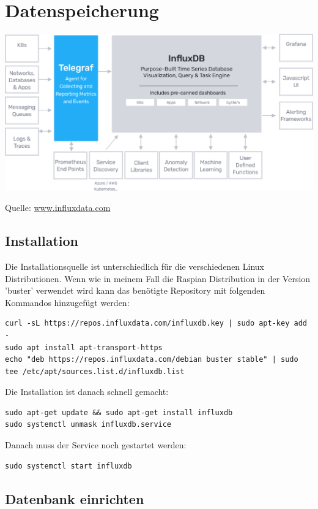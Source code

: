 \documentclass[
  12pt, %
  a4paper, %
  twoside, %
  openany, %
  numbers=noenddot, %
  BCOR=5mm, %
  parskip=half*, %
  thesis, %
]{bfhbook}
\newcommand{\source}[1]{\caption*{Quelle: {#1}} }
\begin{document}
\section{Datenspeicherung}
  \begin{center}
    \includegraphics[width=\textwidth]{Bilder/InfluxDB-2.png}
    \captionsetup{justification=centering}
    \source{\url{www.influxdata.com}}
   \end{center}
   \subsection{Installation}
   Die Installationsquelle ist unterschiedlich für die verschiedenen Linux Distributionen. Wenn wie in meinem Fall die Raspian Distribution in der Version 'buster' verwendet wird kann das benötigte Repository mit folgenden Kommandos hinzugefügt werden:
 \begin{verbatim}
curl -sL https://repos.influxdata.com/influxdb.key | sudo apt-key add -
sudo apt install apt-transport-https
echo "deb https://repos.influxdata.com/debian buster stable" | sudo tee /etc/apt/sources.list.d/influxdb.list
\end{verbatim}
Die Installation ist danach schnell gemacht:
 \begin{verbatim}
sudo apt-get update && sudo apt-get install influxdb
sudo systemctl unmask influxdb.service
   \end{verbatim}
   Danach muss der Service noch gestartet werden:
    \begin{verbatim}
sudo systemctl start influxdb
   \end{verbatim}
   \subsection{Datenbank einrichten}
   
\end{document}
